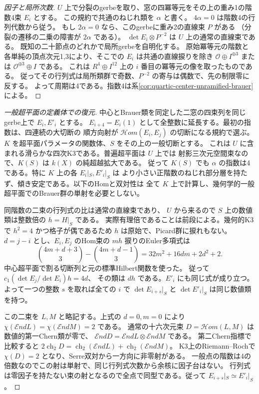 \begin{proof}[因子と局所次数]
$U$ 上で分裂のgerbeを取り、窓の四冪等元をその上の重み1の階数4束 $E_i$ とする。
この規約で共通のねじれ類を $\alpha$ と書く。
$4\alpha=0$ は階数4の行列代数から従う。
もし $2\alpha=0$ なら、このgerbeに重み2の直線束 $P$ がある
（分裂の遷移の二乗の障害が $2\alpha$ である）。
$\det E_i\otimes P^{-2}$ は $U$ 上の通常の直線束である。
既知の二十節点のどれかで局所gerbeを自明化する。
原始冪等元の階数と各単純の頂点次元1,3により、そこでの $E_i$ は共通の直線捩りを除き
$\mathcal O\oplus I^{\oplus3}$ または $\mathcal O^{\oplus3}\oplus I$ である。
これは $R^4\oplus I^{12}$ 上の $i$ 番目の冪等元の像を取ったものである。
従ってその行列式は局所類群で奇数、$P^{-2}$ の寄与は偶数で、先の制限零に反する。
よって周期は4である。指数4は系\ref{cor:quartic-center-unramified-brauer}による。
\end{proof}

\begin{proof}[一般超平面の定義体での復元]
中心とBrauer類を同定した二窓の四束列を同じgerbe上で $E_i,E'_i$ とする。
$E_{i+4}=E_i(1)$ として全整数に延長する。最初の指数は、四連続の大切断の
順方向射が $\mathcal Hom(E_i,E_j)$ の切断になる規約で選ぶ。
$K$ を超平面パラメータの関数体、$S$ をその上の一般切断とする。
これは $U$ に含まれる滑らかな四次K3である。普遍超平面は $U$ 上では
射影三次元空間束なので、$K(S)$ は $k(X)$ の純超越拡大である。
従って $K(S)$ でも $\alpha$ の指数は4である。特に $K$ 上の各 $E_i|_S,E'_i|_S$ は
より小さい正階数のねじれ部分層を持たず、傾き安定である。以下のHomと双対性は
全て $K$ 上で計算し、幾何学的一般超平面でのBrauer群の単射を必要としない。

同階数の二束の行列式の比は通常の直線束であり、
$U$ から来るので $S$ 上の数値類は整数倍の $h=H|_S$ である。
実際有理倍であることは前段による。幾何的K3で $h^2=4$ かつ格子が偶であるため
$h$ は原始で、Picard群に捩れもない。
$d=j-i$ とし、$E_i,E_j$ のHom束の $mh$ 捩りのEuler多項式は
\[
 {4m+d+3\choose3}-{4m+d-1\choose3}
   =32m^2+16dm+2d^2+2 .
\]
中心超平面で割る切断列と元の標準Hilbert関数を使った。
従って $c_1(\det E_j/\det E_i)h=4d$、
その類は $dh$ である。$E'_i$ にも同じ式が成り立つ。
よって一つの整数 $s$ を取れば全ての $i$ で
$\det E_{i+s}|_S$ と $\det E'_i|_S$ は同じ数値類を持つ。

この二束を $L,M$ と略記する。上式の $d=0,m=0$ により
$\chi(\mathcal End L)=\chi(\mathcal End M)=2$ である。
通常の十六次元束 $D=\mathcal Hom(L,M)$ は数値的第一Chern類が零で、
$\mathcal End D=\mathcal End L\otimes\mathcal End M$ である。
第二Chern指標で比較すると $2\operatorname{ch}_2D=
\operatorname{ch}_2(\mathcal End L)+\operatorname{ch}_2(\mathcal End M)$。
K3上のRiemann--Rochで $\chi(D)=2$ となり、Serre双対から一方向に非零射がある。
一般点の階数は4の倍数なのでこの射は単射で、同じ行列式次数から余核に因子台はない。
行列式は零因子を持たない束の射となるので全点で同型である。従って $E_{i+s}|_S\simeq E'_i|_S$。


\end{proof}

